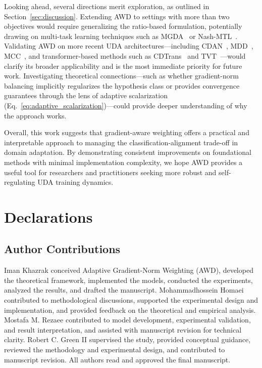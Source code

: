 \documentclass[pdflatex,sn-mathphys-num]{sn-jnl}
\theoremstyle{thmstyleone}
\theoremstyle{thmstyletwo}
\theoremstyle{thmstylethree}
\begin{document}
Looking ahead, several directions merit exploration, as outlined in Section~\ref{sec:discussion}. Extending AWD to settings with more than two objectives would require generalizing the ratio-based formulation, potentially drawing on multi-task learning techniques such as MGDA~\cite{sener2018mgda} or Nash-MTL~\cite{navon2022nashmtl}. Validating AWD on more recent UDA architectures---including CDAN~\cite{long2018cdan}, MDD~\cite{zhang2019mdd}, MCC~\cite{jin2020mcc}, and transformer-based methods such as CDTrans~\cite{xu2022cdtrans} and TVT~\cite{yang2023tvt}---would clarify its broader applicability and is the most immediate priority for future work. Investigating theoretical connections---such as whether gradient-norm balancing implicitly regularizes the hypothesis class or provides convergence guarantees through the lens of adaptive scalarization (Eq.~\eqref{eq:adaptive_scalarization})---could provide deeper understanding of why the approach works.

Overall, this work suggests that gradient-aware weighting offers a practical and interpretable approach to managing the classification-alignment trade-off in domain adaptation. By demonstrating consistent improvements on foundational methods with minimal implementation complexity, we hope AWD provides a useful tool for researchers and practitioners seeking more robust and self-regulating UDA training dynamics.


% 


\section*{Declarations}

\subsection*{Author Contributions}
Iman Khazrak conceived Adaptive Gradient-Norm Weighting (AWD), developed the theoretical framework, implemented the models, conducted the experiments, analyzed the results, and drafted the manuscript. 
Mohammadhossein Homaei contributed to methodological discussions, supported the experimental design and implementation, and provided feedback on the theoretical and empirical analysis. 
Mostafa M. Rezaee contributed to model development, experimental validation, and result interpretation, and assisted with manuscript revision for technical clarity. 
Robert C. Green II supervised the study, provided conceptual guidance, reviewed the methodology and experimental design, and contributed to manuscript revision. 
All authors read and approved the final manuscript.
\end{document}
